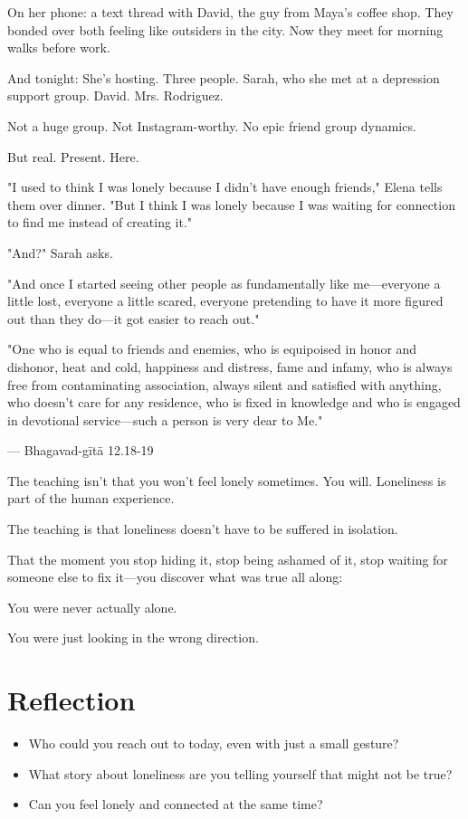 \documentclass[11pt,twoside]{book}
\begin{document}
On her phone: a text thread with David, the guy from Maya's coffee shop. They bonded over both feeling like outsiders in the city. Now they meet for morning walks before work.

And tonight: She's hosting. Three people. Sarah, who she met at a depression support group. David. Mrs. Rodriguez.

Not a huge group. Not Instagram-worthy. No epic friend group dynamics.

But real. Present. Here.

"I used to think I was lonely because I didn't have enough friends," Elena tells them over dinner. "But I think I was lonely because I was waiting for connection to find me instead of creating it."

"And?" Sarah asks.

"And once I started seeing other people as fundamentally like me—everyone a little lost, everyone a little scared, everyone pretending to have it more figured out than they do—it got easier to reach out."

\begin{pullquote}
"One who is equal to friends and enemies, who is equipoised in honor and dishonor, heat and cold, happiness and distress, fame and infamy, who is always free from contaminating association, always silent and satisfied with anything, who doesn't care for any residence, who is fixed in knowledge and who is engaged in devotional service—such a person is very dear to Me."

--- Bhagavad-gītā 12.18-19
\end{pullquote}

The teaching isn't that you won't feel lonely sometimes. You will. Loneliness is part of the human experience.

The teaching is that loneliness doesn't have to be suffered in isolation.

That the moment you stop hiding it, stop being ashamed of it, stop waiting for someone else to fix it—you discover what was true all along:

You were never actually alone.

You were just looking in the wrong direction.

\section*{Reflection}

\begin{itemize}
\item Who could you reach out to today, even with just a small gesture?
\item What story about loneliness are you telling yourself that might not be true?
\item Can you feel lonely and connected at the same time?
\end{itemize}
\end{document}
